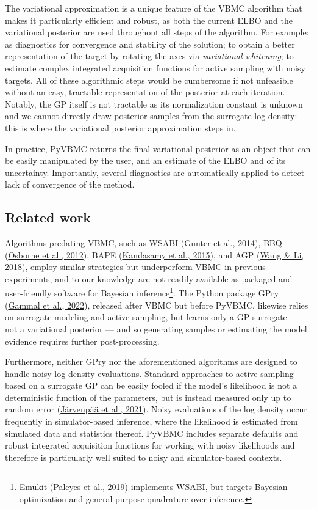 \documentclass[
]{article}
\begin{document}
The variational approximation is a unique feature of the VBMC algorithm
that makes it particularly efficient and robust, as both the current
ELBO and the variational posterior are used throughout all steps of the
algorithm. For example: as diagnostics for convergence and stability of
the solution; to obtain a better representation of the target by
rotating the axes via \emph{variational whitening}; to estimate complex
integrated acquisition functions for active sampling with noisy targets.
All of these algorithmic steps would be cumbersome if not unfeasible
without an easy, tractable representation of the posterior at each
iteration. Notably, the GP itself is not tractable as its normalization
constant is unknown and we cannot directly draw posterior samples from
the surrogate log density: this is where the variational posterior
approximation steps in.

In practice, PyVBMC returns the final variational posterior as an object
that can be easily manipulated by the user, and an estimate of the ELBO
and of its uncertainty. Importantly, several diagnostics are
automatically applied to detect lack of convergence of the method.

\hypertarget{related-work}{%
\subsection{Related work}\label{related-work}}

Algorithms predating VBMC, such as WSABI
(\protect\hyperlink{ref-gunter_sampling_2014}{Gunter et al., 2014}), BBQ
(\protect\hyperlink{ref-osborne_active_2012}{Osborne et al., 2012}),
BAPE (\protect\hyperlink{ref-kandasamy_bayesian_2015}{Kandasamy et al.,
2015}), and AGP (\protect\hyperlink{ref-wang_adaptive_2018}{Wang \& Li,
2018}), employ similar strategies but underperform VBMC in previous
experiments, and to our knowledge are not readily available as packaged
and user-friendly software for Bayesian inference\footnote{Emukit
  (\protect\hyperlink{ref-paleyes_emulation_2019}{Paleyes et al., 2019})
  implements WSABI, but targets Bayesian optimization and
  general-purpose quadrature over inference.}. The Python package GPry
(\protect\hyperlink{ref-gammal_fast_2022}{Gammal et al., 2022}),
released after VBMC but before PyVBMC, likewise relies on surrogate
modeling and active sampling, but learns only a GP surrogate --- not a
variational posterior --- and so generating samples or estimating the
model evidence requires further post-processing.

Furthermore, neither GPry nor the aforementioned algorithms are designed
to handle noisy log density evaluations. Standard approaches to active
sampling based on a surrogate GP can be easily fooled if the model's
likelihood is not a deterministic function of the parameters, but is
instead measured only up to random error
(\protect\hyperlink{ref-jarvenpaa_parallel_2021}{Järvenpää et al.,
2021}). Noisy evaluations of the log density occur frequently in
simulator-based inference, where the likelihood is estimated from
simulated data and statistics thereof. PyVBMC includes separate defaults
and robust integrated acquisition functions for working with noisy
likelihoods and therefore is particularly well suited to noisy and
simulator-based contexts.
\end{document}

